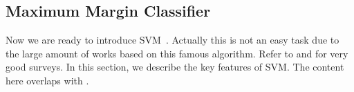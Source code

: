 %
\subsection{Maximum Margin Classifier}

Now we are ready to introduce SVM~\cite{ml/CortesV95,Vapnik98}. Actually this is not an easy task due to the large amount of works based on this famous algorithm. Refer to \cite{datamine/Burges98} and \cite{ss/MoguerzaM06} for very good surveys. In this section, we describe the key features of SVM. The content here overlaps with \cite{ss/MoguerzaM06}.

